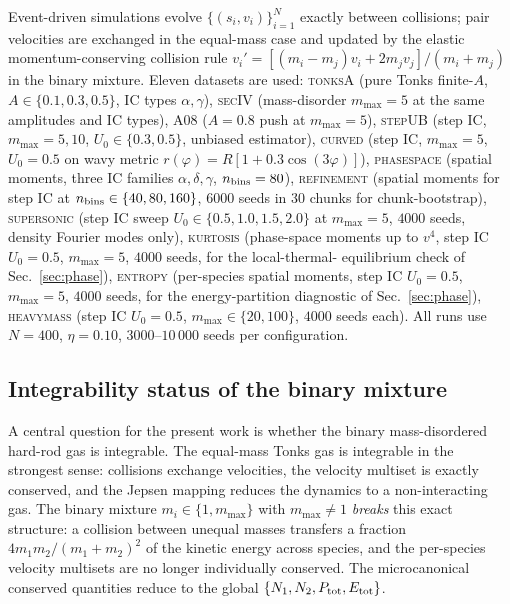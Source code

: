 \documentclass[aps,pre,twocolumn,superscriptaddress,longbibliography,floatfix]{revtex4-2}
\begin{document}
Event-driven simulations evolve $\{(s_i,v_i)\}_{i=1}^N$ exactly
between collisions; pair velocities are exchanged in the
equal-mass case and updated by the elastic momentum-conserving
collision rule
$v_i'=[(m_i-m_j)v_i + 2 m_j v_j]/(m_i+m_j)$ in the binary
mixture. Eleven datasets are used:
\textsc{tonksA} (pure Tonks finite-$A$, $A\in\{0.1,0.3,0.5\}$,
IC types $\alpha,\gamma$),
\textsc{secIV} (mass-disorder $m_{\max}=5$ at the same
amplitudes and IC types),
\textsc{A08} ($A=0.8$ push at $m_{\max}=5$),
\textsc{stepUB} (step IC, $m_{\max}=5,10$,
$U_0\in\{0.3,0.5\}$, unbiased estimator),
\textsc{curved} (step IC, $m_{\max}=5$, $U_0=0.5$ on wavy
metric $r(\varphi)=R[1+0.3\cos(3\varphi)]$),
\textsc{phasespace} (spatial moments, three IC families
$\alpha,\delta,\gamma$, $n_{\rm bins}=80$),
\textsc{refinement} (spatial moments for step IC at
$n_{\rm bins}\in\{40,80,160\}$, $6000$ seeds in $30$
chunks for chunk-bootstrap),
\textsc{supersonic} (step IC sweep
$U_0\in\{0.5,1.0,1.5,2.0\}$ at $m_{\max}=5$,
$4000$ seeds, density Fourier modes only),
\textsc{kurtosis} (phase-space moments up to $v^4$, step IC
$U_0=0.5$, $m_{\max}=5$, $4000$ seeds, for the local-thermal-%
equilibrium check of Sec.~\ref{sec:phase}),
\textsc{entropy} (per-species spatial moments, step IC
$U_0=0.5$, $m_{\max}=5$, $4000$ seeds, for the energy-partition
diagnostic of Sec.~\ref{sec:phase}),
\textsc{heavymass} (step IC $U_0=0.5$,
$m_{\max}\in\{20,100\}$, $4000$ seeds each).
All runs use $N=400$, $\eta=0.10$, $3000$--$10\,000$ seeds per
configuration.

\subsection{Integrability status of the binary mixture}
\label{sec:integrability}

A central question for the present work is whether the binary
mass-disordered hard-rod gas is integrable. The equal-mass Tonks
gas is integrable in the strongest sense: collisions exchange
velocities, the velocity multiset is exactly conserved, and the
Jepsen mapping \cite{Jepsen1965} reduces the dynamics to a
non-interacting gas. The binary mixture
$m_i\in\{1,m_{\max}\}$ with $m_{\max}\neq 1$ \emph{breaks} this
exact structure: a collision between unequal masses transfers a
fraction $4 m_1 m_2/(m_1+m_2)^2$ of the kinetic energy across
species, and the per-species velocity multisets are no longer
individually conserved. The microcanonical conserved quantities
reduce to the global $\{N_1, N_2, P_{\rm tot}, E_{\rm tot}\}$.
\end{document}
